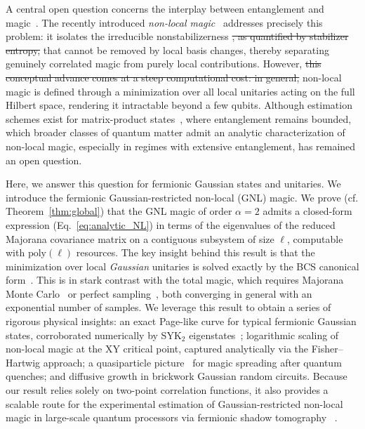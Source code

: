 \documentclass[aps,prl,twocolumn,superscriptaddress,reprint,longbibliography,nofootinbib]{revtex4-2}
\newcommand{\RENYI}{\alpha}
\providecommand{\DIFaddtex}[1]{{\protect\color{blue}\uwave{#1}}} %
\providecommand{\DIFdeltex}[1]{{\protect\color{red}\sout{#1}}}                      %
\providecommand{\DIFaddbegin}{} %
\providecommand{\DIFaddend}{} %
\providecommand{\DIFdelbegin}{} %
\providecommand{\DIFdelend}{} %
\providecommand{\DIFadd}[1]{\texorpdfstring{\DIFaddtex{#1}}{#1}} %
\providecommand{\DIFdel}[1]{\texorpdfstring{\DIFdeltex{#1}}{}} %
\newcommand{\DIFscaledelfig}{0.5}
\newlength{\DIFdelgraphicswidth} %
\newlength{\DIFdelgraphicsheight} %
\newcommand{\DIFaddincludegraphics}[2][]{{\color{blue}\fbox{\DIFOincludegraphics[#1]{#2}}}} %
\newcommand{\DIFdelincludegraphics}[2][]{%
\sbox{\DIFdelgraphicsbox}{\DIFOincludegraphics[#1]{#2}}%
\settoboxwidth{\DIFdelgraphicswidth}{\DIFdelgraphicsbox} %
\settoboxtotalheight{\DIFdelgraphicsheight}{\DIFdelgraphicsbox} %
\scalebox{\DIFscaledelfig}{%
\parbox[b]{\DIFdelgraphicswidth}{\usebox{\DIFdelgraphicsbox}\\[-\baselineskip] \rule{\DIFdelgraphicswidth}{0em}}\llap{\resizebox{\DIFdelgraphicswidth}{\DIFdelgraphicsheight}{%
\setlength{\unitlength}{\DIFdelgraphicswidth}%
\begin{picture}(1,1)%
\thicklines\linethickness{2pt} %
{\color[rgb]{1,0,0}\put(0,0){\framebox(1,1){}}}%
{\color[rgb]{1,0,0}\put(0,0){\line( 1,1){1}}}%
{\color[rgb]{1,0,0}\put(0,1){\line(1,-1){1}}}%
\end{picture}%
}\hspace*{3pt}}} %
} %
\DeclareRobustCommand{\DIFaddbegin}{\DIFOaddbegin \let\includegraphics\DIFaddincludegraphics} %
\DeclareRobustCommand{\DIFaddend}{\DIFOaddend \let\includegraphics\DIFOincludegraphics} %
\DeclareRobustCommand{\DIFdelbegin}{\DIFOdelbegin \let\includegraphics\DIFdelincludegraphics} %
\DeclareRobustCommand{\DIFdelend}{\DIFOaddend \let\includegraphics\DIFOincludegraphics} %
\begin{document}
A central open question concerns the interplay between entanglement and magic~\cite{tirrito2024quantifying,szombathy,Iannotti2025entanglement}.
The recently introduced \emph{non-local magic}~\cite{Cao_2025,qian2025quantumnonlocalnonstabilizerness, munizzi2026magicnoncliffordgatestopological, cao2024non} addresses precisely this problem: it isolates the irreducible nonstabilizerness \DIFdelbegin \DIFdel{, as quantified by stabilizer entropy, }\DIFdelend that cannot be removed by local basis changes, thereby separating genuinely correlated magic from purely local contributions.
However, \DIFdelbegin \DIFdel{this conceptual advance comes at a steep computational cost: in general, }\DIFdelend non-local magic is defined through a minimization over all local unitaries acting on the full Hilbert space, rendering it intractable beyond a few qubits.
Although estimation schemes exist for matrix-product states~\cite{Cao_2025}, where entanglement remains bounded, which broader classes of quantum matter admit an analytic characterization of non-local magic, especially in regimes with extensive entanglement, has remained an open question.

Here, we answer this question for fermionic Gaussian states and unitaries. We introduce the fermionic Gaussian-restricted non-local (GNL) magic.
We prove (cf. Theorem~\ref{thm:global}) that the GNL magic of order $\RENYI=2$ admits a closed-form expression (Eq.~\eqref{eq:analytic_NL}) in terms of the eigenvalues of the reduced Majorana covariance matrix on a contiguous subsystem of size $\ell$, computable with $\mathrm{poly}(\ell)$ resources.
The key insight behind this result is that the minimization over local \emph{Gaussian} unitaries is solved exactly by the BCS canonical form~\cite{BoteroReznik2004}.
This is in stark contrast with the total magic, which requires Majorana Monte Carlo~\cite{Bera_2025} or perfect sampling~\cite{collura2026nonstabilizernessfermionicgaussianstates}, both converging in general with an exponential number of samples.
We leverage this result to obtain a series of rigorous physical insights: an exact Page-like curve for typical fermionic Gaussian states, corroborated numerically by SYK$_2$ eigenstates~\cite{Bera_2025,santra2025complexitytransitionschaoticquantum,jasser2025stabilizer, malvimat2026multipartitenonlocalmagicsyk, njgn-fksh}; logarithmic scaling of non-local magic at the XY critical point, captured analytically via the Fisher--Hartwig approach; a quasiparticle picture~\cite{calabrese2009} for magic spreading after quantum quenches; and diffusive growth in brickwork Gaussian random circuits.
Because our result relies solely on two-point correlation functions, it also provides a scalable route for the experimental estimation of Gaussian-restricted non-local magic in large-scale quantum processors via fermionic shadow tomography~\cite{Wan_2023} \DIFaddbegin \DIFadd{(End Matter)}\DIFaddend .
\end{document}
